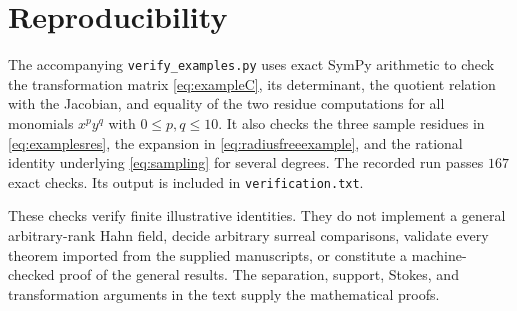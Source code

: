 \documentclass[11pt,letterpaper]{article}
\theoremstyle{definition}
\theoremstyle{remark}
\numberwithin{equation}{section}
\begin{document}
\section{Reproducibility}\label{app:verification}
The accompanying \texttt{verify\_examples.py} uses exact SymPy arithmetic to check the transformation matrix \eqref{eq:exampleC}, its determinant, the quotient relation with the Jacobian, and equality of the two residue computations for all monomials $x^py^q$ with $0\le p,q\le10$. It also checks the three sample residues in \eqref{eq:examplesres}, the expansion in \eqref{eq:radiusfreeexample}, and the rational identity underlying \eqref{eq:sampling} for several degrees. The recorded run passes $167$ exact checks. Its output is included in \texttt{verification.txt}.

These checks verify finite illustrative identities. They do not implement a general arbitrary-rank Hahn field, decide arbitrary surreal comparisons, validate every theorem imported from the supplied manuscripts, or constitute a machine-checked proof of the general results. The separation, support, Stokes, and transformation arguments in the text supply the mathematical proofs.
\end{document}

